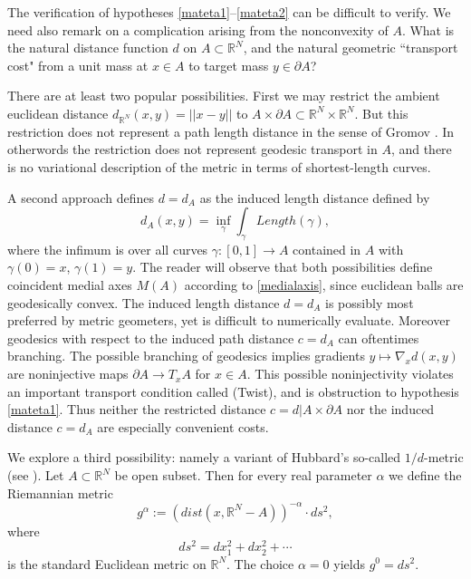 \documentclass[12pt]{article}
\theoremstyle{definition}
\theoremstyle{remark}
\newcommand{\bR}{\mathbb{R}}
\newcommand{\del}{\partial}
\begin{document}

The verification of hypotheses \eqref{mateta1}--\eqref{mateta2} can be difficult to verify. We need also remark on a complication arising from the nonconvexity of $A$. What is the natural distance function $d$ on $A\subset \bR^N$, and the natural geometric ``transport cost" from a unit mass at $x\in A$ to target mass $y\in \del A$? 

There are at least two popular possibilities. First we may restrict the ambient euclidean distance $d_{\bR^N}(x,y)=||x-y||$ to $A\times \del A \subset \bR^N \times \bR^N$. But this restriction does not represent a path length distance in the sense of Gromov \cite[1.A-B]{lafontaine2001metric}. In otherwords the restriction does not represent geodesic transport in $A$, and there is no variational description of the metric in terms of shortest-length curves. 

A second approach defines $d=d_A$ as the induced length distance defined by $$d_A(x,y)=\inf_\gamma \int_\gamma Length(\gamma), $$ where the infimum is over all curves $\gamma:[0,1] \to A$ contained in $A$ with $\gamma(0)=x$, $\gamma(1)=y$. The reader will observe that both possibilities define coincident medial axes $M(A)$ according to \eqref{medialaxis}, since euclidean balls are geodesically convex. The induced length distance $d=d_A$ is possibly most preferred by metric geometers, yet is difficult to numerically evaluate. Moreover geodesics with respect to the induced path distance $c=d_A$ can oftentimes branching. The possible branching of geodesics implies gradients $y\mapsto \nabla_x d(x,y)$ are noninjective maps $\del A \to T_x A$ for $x\in A$. This possible noninjectivity violates an important transport condition called (Twist), and is obstruction to hypothesis \eqref{mateta1}. Thus neither the restricted distance $c=d|A\times \del A$ nor the induced distance $c=d_A$ are especially convenient costs. 

We explore a third possibility: namely a variant of Hubbard's so-called $1/d$-metric (see \cite[Ch. 2.2, pp.33]{hubbard}). Let $A\subset \bR^N$ be open subset. Then for every real parameter $\alpha$ we define the Riemannian metric \begin{equation}\label{ga} g^\alpha:=(dist(x, \bR^N -A))^{-\alpha} \cdot ds^2,\end{equation} where $$ds^2=dx_1^2+dx_2^2+\cdots$$ is the standard Euclidean metric on $\bR^N$. The choice $\alpha=0$ yields $g^0=ds^2$. 
\end{document}

